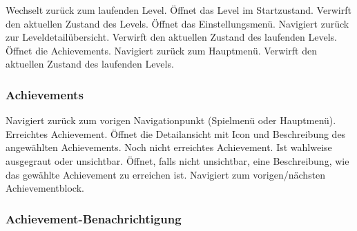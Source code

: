 \begin{requirements}
 Wechselt zurück zum laufenden Level.
 Öffnet das Level im Startzustand. Verwirft den aktuellen Zustand des Levels.
 Öffnet das Einstellungsmenü.
 Navigiert zurück zur Leveldetailübersicht. Verwirft den aktuellen Zustand des laufenden Levels.
 Öffnet die Achievements.
 Navigiert zurück zum Hauptmenü. Verwirft den aktuellen Zustand des laufenden Levels.
\end{requirements}

\subsubsection{Achievements}

\begin{center}
\setlength\fboxsep{20pt}
\setlength\fboxrule{1pt}
\end{center}

\begin{requirements}
 Navigiert zurück zum vorigen Navigationpunkt (Spielmenü oder Hauptmenü).
 Erreichtes Achievement. Öffnet die Detailansicht mit Icon und Beschreibung des angewählten Achievements.
 Noch nicht erreichtes Achievement. Ist wahlweise ausgegraut oder unsichtbar. Öffnet, falls nicht unsichtbar, eine Beschreibung, wie das gewählte Achievement zu erreichen ist.
 Navigiert zum vorigen/nächsten Achievementblock.
\end{requirements}

\subsubsection{Achievement-Benachrichtigung}

